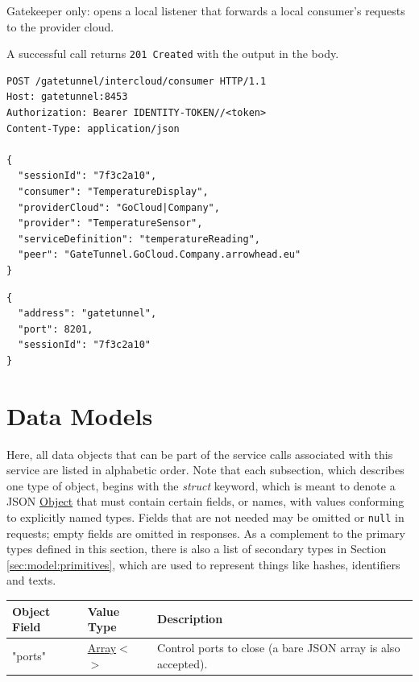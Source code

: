 \documentclass[a4paper]{arrowhead}
\newcommand{\oref}[1]{{\textcolor{ArrowheadBlue}{\hyperref[sec:operations:#1]{#1}}}}
\newcommand{\pref}[1]{{\textcolor{ArrowheadGrey}{\hyperref[sec:model:primitives:#1]{#1}}}}
\begin{document}
Gatekeeper only: opens a local listener that forwards a local consumer's requests to the provider cloud.

A successful call returns \texttt{201 Created} with the output in the body.

\begin{lstlisting}[label={lst:open-consumer-session},caption={An \oref{open-consumer-session} invocation.}]
POST /gatetunnel/intercloud/consumer HTTP/1.1
Host: gatetunnel:8453
Authorization: Bearer IDENTITY-TOKEN//<token>
Content-Type: application/json

{
  "sessionId": "7f3c2a10",
  "consumer": "TemperatureDisplay",
  "providerCloud": "GoCloud|Company",
  "provider": "TemperatureSensor",
  "serviceDefinition": "temperatureReading",
  "peer": "GateTunnel.GoCloud.Company.arrowhead.eu"
}
\end{lstlisting}

\begin{lstlisting}[label={lst:open-consumer-session-resp},caption={An \oref{open-consumer-session} response.}]
{
  "address": "gatetunnel",
  "port": 8201,
  "sessionId": "7f3c2a10"
}
\end{lstlisting}

\newpage

\section{Data Models}
\label{sec:model}

Here, all data objects that can be part of the service calls associated with this service are listed in alphabetic order.
Note that each subsection, which describes one type of object, begins with the \textit{struct} keyword, which is meant to denote a JSON \pref{Object} that must contain certain fields, or names, with values conforming to explicitly named types.
Fields that are not needed may be omitted or \texttt{null} in requests; empty fields are omitted in responses.
As a complement to the primary types defined in this section, there is also a list of secondary types in Section \ref{sec:model:primitives}, which are used to represent things like hashes, identifiers and texts.





\noindent\begin{tabularx}{\textwidth}{| >{\raggedright\arraybackslash}p{3.9cm} | >{\raggedright\arraybackslash\small}p{5.3cm} | X |} \hline
\rowcolor{gray!33} Object Field & Value Type & Description \\ \hline
"ports" & \pref{Array}$<$\allowbreak{}\pref{Number}$>$ & Control ports to close (a bare JSON array is also accepted). \\ \hline
\end{tabularx}
\end{document}
